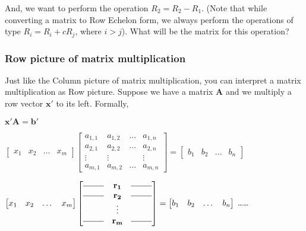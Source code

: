 \documentclass[a4paper]{article}
\begin{document}
        And, we want to perform the operation $R_2 = R_2 - R_1$. (Note that while converting a matrix to Row Echelon form, we always perform the operations of type $R_i = R_i + cR_j$, where $i > j$). What will be the matrix for this operation?
        
        \subsubsection{Row picture of matrix multiplication}
            Just like the Column picture of matrix multiplication, you can interpret a matrix multiplication as Row picture. Suppose we have a matrix $\mathbf{A}$ and we multiply a row vector $\mathbf{x'}$ to its left. Formally,
            
            \begin{center}
                $
                \mathbf{x'}\mathbf{A} = \mathbf{b'}
                $
                
                $
                \begin{bmatrix}
                x_1   &
                x_2   &
                \dots &
                x_m 
                \end{bmatrix}
                \begin{bmatrix}
                a_{1,1} & a_{1,2} & \dots & a_{1,n} \\ 
                a_{2,1} & a_{2,2} & \dots & a_{2,n} \\
                \vdots  & \vdots  &       & \vdots  \\
                a_{m,1} & a_{m,2} & \dots & a_{m,n} 
                \end{bmatrix}
                 = 
                \begin{bmatrix}
                b_1   &
                b_2   &
                \dots &
                b_n
                \end{bmatrix}
                $
                
                $
                \begin{bmatrix}
                x_1   &
                x_2   &
                \dots &
                x_m 
                \end{bmatrix}
                \begin{bmatrix}
                \rule[.5ex]{2.5em}{0.4pt} & \mathbf{r_1} & \rule[.5ex]{2.5em}{0.4pt} \\ 
                \rule[.5ex]{2.5em}{0.4pt} & \mathbf{r_2} & \rule[.5ex]{2.5em}{0.4pt} \\
                   & \vdots  &  \\
                \rule[.5ex]{2.5em}{0.4pt} & \mathbf{r_m} & \rule[.5ex]{2.5em}{0.4pt}
                \end{bmatrix}
                 = 
                \begin{bmatrix}
                b_1   &
                b_2   &
                \dots &
                b_n
                \end{bmatrix}
                $ \dots\dots {}
            \end{center}
\end{document}
